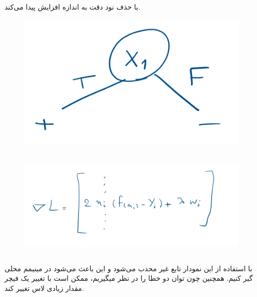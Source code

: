 \documentclass{university}
\begin{document}
\subsection{}
با حذف نود 
دقت به اندازه 
افزایش پیدا می‌کند. 
\begin{figure}[H]
    \centering
    \includegraphics[width=\textwidth]{assets/3c.png}
\end{figure}

\section{}
\subsection{}
\begin{figure}[H]
    \centering
    \includegraphics[width=\textwidth]{assets/4a.png}
\end{figure}

\subsection{}
با استفاده از این 
نمودار تابع غیر محدب می‌شود و این باعث می‌شود در مینیمم محلی گیر کنیم. 
همچنین چون توان دو خطا را در نظر میگیریم، ممکن است با تغییر 
یک فیچر مقدار زیادی لاس تغییر کند.
\end{document}
